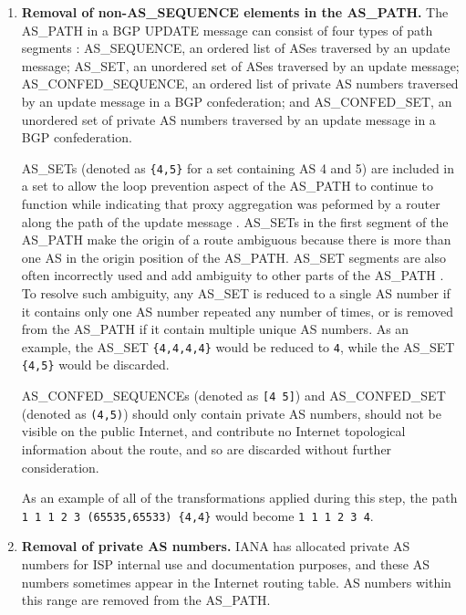 \begin{enumerate}
    \item{\textbf{Removal of non-AS\_SEQUENCE elements in the AS\_PATH.} The
    AS\_PATH in a BGP UPDATE message can consist of four types of path segments
    \cite{rfc5065}: AS\_SEQUENCE, an ordered list of ASes traversed by an
    update message; AS\_SET, an unordered set of ASes traversed by an update
    message; AS\_CONFED\_SEQUENCE, an ordered list of private AS numbers
    traversed by an update message in a BGP confederation; and AS\_CONFED\_SET,
    an unordered set of private AS numbers traversed by an update message in a
    BGP confederation.

    AS\_SETs (denoted as \verb!{4,5}! for a set containing AS 4 and 5) are
    included in a set to allow the loop prevention aspect of the AS\_PATH to
    continue to function while indicating that proxy aggregation was peformed
    by a router along the path of the update message
    \cite{draft-deprecate-as-sets-04}. AS\_SETs in the first segment of the
    AS\_PATH make the origin of a route ambiguous because there is more than
    one AS in the origin position of the AS\_PATH. AS\_SET segments are also
    often incorrectly used and add ambiguity to other parts of the AS\_PATH
    \cite{draft-deprecate-as-sets-04}. To resolve such ambiguity, any AS\_SET
    is reduced to a single AS number if it contains only one AS number repeated
    any number of times, or is removed from the AS\_PATH if it contain multiple
    unique AS numbers. As an example, the AS\_SET \verb!{4,4,4,4}! would be
    reduced to \verb!4!, while the AS\_SET \verb!{4,5}! would be discarded.

    AS\_CONFED\_SEQUENCEs (denoted as \verb![4 5]!) and AS\_CONFED\_SET
    (denoted as \verb!(4,5)!) should only contain private AS numbers, should
    not be visible on the public Internet, and contribute no Internet
    topological information about the route, and so are discarded without
    further consideration.

    As an example of all of the transformations applied during this step, the
    path \\
    \verb!1 1 1 2 3 (65535,65533) {4,4}! would become \verb!1 1 1 2 3 4!.
    }

    \item{\textbf{Removal of private AS numbers.} IANA has allocated private AS
    numbers \cite{rfc1930,rfc5398} for ISP internal use and documentation
    purposes, and these AS numbers sometimes appear in the Internet routing
    table. AS numbers within this range are removed from the AS\_PATH.}


\end{enumerate}
